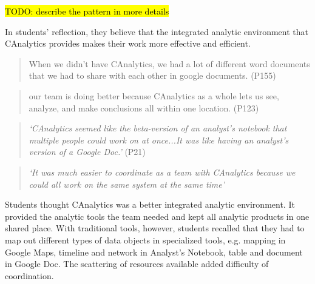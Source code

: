 \hl{TODO: describe the pattern in more details}

In students' reflection, they believe that the integrated analytic environment that CAnalytics provides makes their work more effective and efficient. 

\begin{quote}
	When we didn’t have CAnalytics, we had a lot of different word documents that we had to share with each other in google documents. (P155)
\end{quote}

\begin{quote}
	our team is doing better because CAnalytics as a whole lets us see, analyze, and make conclusions all within one location. (P123)
\end{quote}







\begin{quote}
	\textit{`CAnalytics seemed like the beta-version of an analyst's notebook that multiple people could work on at once...It was like having an analyst's version of a Google Doc.'} (P21)
\end{quote}






\begin{quote}
\textit{`It was much easier to coordinate as a team with CAnalytics because we could all work on the same system at the same time'}
\end{quote}

Students thought CAnalytics was a better integrated analytic environment. It provided the analytic tools the team needed and kept all analytic products in one shared place. With traditional tools, however, students recalled that they had to map out different types of data objects in specialized tools, e.g. mapping in Google Maps, timeline and network in Analyst's Notebook, table and document in Google Doc. The scattering of resources available added difficulty of coordination.



